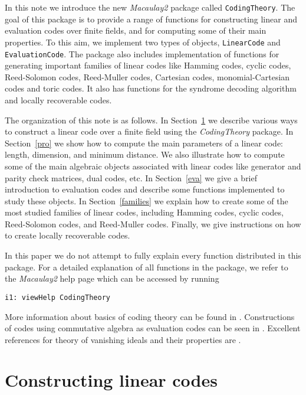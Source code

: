 \documentclass[12pt]{amsart}
\theoremstyle{plain}
\begin{document}
In this note we introduce the new {\it Macaulay2} \cite{M2} package called {\tt CodingTheory}. The goal of this package is to provide a range of functions for constructing  linear and evaluation codes over finite fields, and for computing some of their main properties. To this aim, we implement two types of objects, {\tt LinearCode} and {\tt EvaluationCode}. The package also includes implementation of functions for generating important families of linear codes like Hamming codes, cyclic codes, Reed-Solomon codes, Reed-Muller codes, Cartesian codes, monomial-Cartesian codes and toric codes. It also has functions for the syndrome decoding algorithm and locally recoverable codes. 

The organization of this note is as follows. In Section~\ref{def} we describe various ways to construct a linear code over a finite field using the \textit{CodingTheory} package. In Section~\ref{pro} we show how to compute the main parameters of a linear code: length, dimension, and minimum distance. We also illustrate how to compute some of the main algebraic objects associated with linear codes like generator and parity check matrices, dual codes, etc. In Section~\ref{eva} we give a brief introduction to evaluation codes and describe some functions implemented to study these objects. In Section~\ref{families} we explain how to create some of the most studied families of linear codes, including Hamming codes, cyclic codes, Reed-Solomon codes, and Reed-Muller codes. Finally, we give instructions on how to create locally recoverable codes.

In this paper we do not attempt to fully explain every function distributed in this package. For a detailed explanation of all functions in the package, we refer to the {\it Macaulay2} help page which can be accessed by
running

\medskip

\begin{verbatim}
i1: viewHelp CodingTheory
\end{verbatim}

\medskip

More information about basics of coding theory can be found in \cite{huf-pless,MacWilliams-Sloane,van-lint}. Constructions of codes using commutative algebra as evaluation codes can be seen in
\cite{carvalho4,GLS,Ha1,LSc,MPV,MPV2,algcodes,renteria-tapia-ca2, Ru, SoSo, So1}. Excellent references for theory of vanishing ideals and their properties are \cite{CLO,monalg}.

\section{Constructing linear codes}\label{def}
\end{document}
